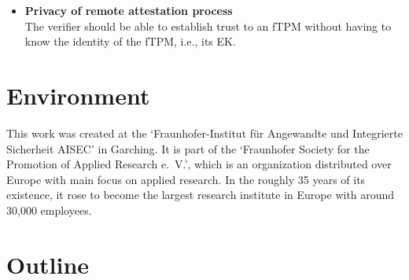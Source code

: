 \begin{itemize}



  \item{\textbf{Privacy of remote attestation process}\\
  The verifier should be able to establish trust to an fTPM without having to know the identity of the fTPM, i.e., its EK\@.}
\end{itemize}



\section{Environment}

This work was created at the `Fraunhofer-Institut für Angewandte und Integrierte Sicherheit AISEC' in Garching.
It is part of the `Fraunhofer Society for the Promotion of Applied Research e.~V.', which is an organization distributed over Europe with main focus on applied research.
In the roughly 35 years of its existence, it rose to become the largest research institute in Europe with around 30,000 employees.

\section{Outline}


